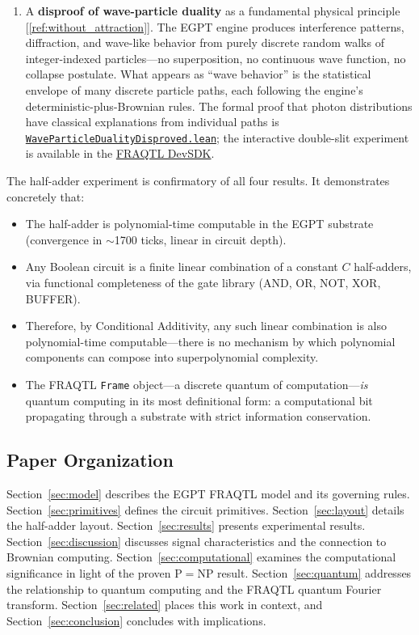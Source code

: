\documentclass[11pt,a4paper]{article}
\begin{document}
\begin{enumerate}[label=(\roman*)]
    \item A \textbf{disproof of wave-particle duality} as a fundamental physical principle [\ref{ref:without_attraction}]. The EGPT engine produces interference patterns, diffraction, and wave-like behavior from purely discrete random walks of integer-indexed particles---no superposition, no continuous wave function, no collapse postulate. What appears as ``wave behavior'' is the statistical envelope of many discrete particle paths, each following the engine's deterministic-plus-Brownian rules. The formal proof that photon distributions have classical explanations from individual paths is \href{https://eabadir.github.io/EGPT/Lean/PPNP/Proofs/WaveParticleDualityDisproved.lean}{\texttt{WaveParticleDualityDisproved.lean}}; the interactive double-slit experiment is available in the \href{https://eabadir.github.io/EGPT/www/fraqtl_devsdk/index.html}{FRAQTL DevSDK}.
\end{enumerate}

The half-adder experiment is confirmatory of all four results. It demonstrates concretely that:

\begin{itemize}
    \item The half-adder is polynomial-time computable in the EGPT substrate (convergence in $\sim$1700 ticks, linear in circuit depth).
    \item Any Boolean circuit is a finite linear combination of a constant $C$ half-adders, via functional completeness of the gate library (AND, OR, NOT, XOR, BUFFER).
    \item Therefore, by Conditional Additivity, any such linear combination is also polynomial-time computable---there is no mechanism by which polynomial components can compose into superpolynomial complexity.
    \item The FRAQTL \texttt{Frame} object---a discrete quantum of computation---\emph{is} quantum computing in its most definitional form: a computational bit propagating through a substrate with strict information conservation.
\end{itemize}

\subsection{Paper Organization}

Section~\ref{sec:model} describes the EGPT FRAQTL model and its governing rules. Section~\ref{sec:primitives} defines the circuit primitives. Section~\ref{sec:layout} details the half-adder layout. Section~\ref{sec:results} presents experimental results. Section~\ref{sec:discussion} discusses signal characteristics and the connection to Brownian computing. Section~\ref{sec:computational} examines the computational significance in light of the proven $\mathrm{P} = \mathrm{NP}$ result. Section~\ref{sec:quantum} addresses the relationship to quantum computing and the FRAQTL quantum Fourier transform. Section~\ref{sec:related} places this work in context, and Section~\ref{sec:conclusion} concludes with implications.
\end{document}

